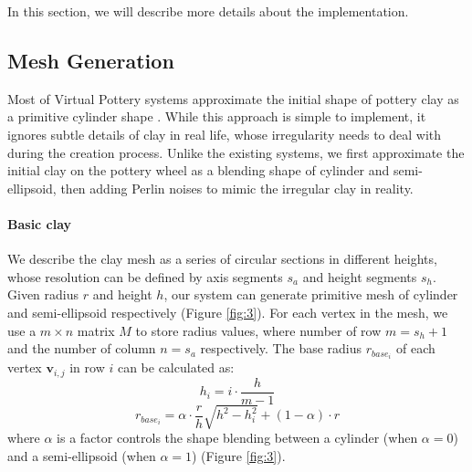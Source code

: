 In this section, we will describe more details about the implementation. 

\subsection{Mesh Generation}
\label{sec:4.1}

Most of Virtual Pottery systems approximate the initial shape of pottery clay as a primitive cylinder shape \cite{han2007ar,ramani2015gesture,Vinayak2016Extracting}. While this approach is simple to implement, it ignores subtle details of clay in real life, whose irregularity needs to deal with during the creation process. Unlike the existing systems, we first approximate the initial clay on the pottery wheel as a blending shape of cylinder and semi-ellipsoid, then adding Perlin noises to mimic the irregular clay in reality.

\paragraph{Basic clay} We describe the clay mesh as a series of circular sections in different heights, whose resolution can be defined by axis segments $s_{a}$ and height segments $s_{h}$. Given radius $r$ and height $h$, our system can generate primitive mesh of cylinder and semi-ellipsoid respectively (Figure \ref{fig:3}).
For each vertex in the mesh, we use a $m \times n$ matrix $M$ to store radius values, where number of row $m = s_{h} + 1$ and the number of column $n = s_{a}$ respectively. The base radius $r_{base_{i}}$ of each vertex $\mathbf{v}_{i,j}$ in row $i$ can be calculated as: 
\begin{equation}
h_{i} = i \cdot \frac{h}{m-1}
\end{equation}
\begin{equation}
r_{base_{i}} = \alpha \cdot \frac{r}{h} \sqrt{h^2 -  h_{i}^2} + (1 - \alpha) \cdot r
\end{equation}
where $\alpha$ is a factor controls the shape blending between a  cylinder (when $\alpha=0$) and a semi-ellipsoid (when $\alpha=1$) (Figure \ref{fig:3}).


